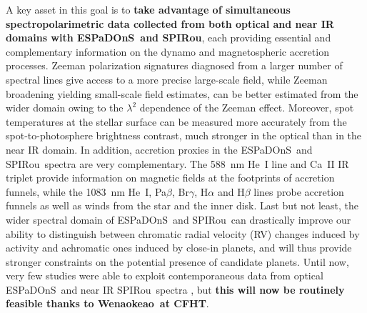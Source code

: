 \documentclass[
    traditabstract,
    longauth,
    onecolumn,
]{aa}
\def \spi{SPIRou}
\def \esp{ESPaDOnS}
\def \wena{Wenaokeao}
\begin{document}
A key asset in this goal is to {\bf take advantage of simultaneous spectropolarimetric data collected from both optical and near IR domains with \esp\ and \spi}, each providing essential and complementary information on the dynamo and magnetospheric accretion processes.  Zeeman polarization signatures diagnosed from a larger number of spectral lines give access to a more precise large-scale field, while Zeeman broadening yielding small-scale field estimates, can be better estimated from the wider domain owing to the $\lambda^2$ dependence of the Zeeman effect.  Moreover, spot temperatures at the stellar surface can be measured more accurately from the spot-to-photosphere brightness contrast, much stronger in the optical than in the near IR domain.  In addition, accretion proxies in the \esp\ and \spi\ spectra are very complementary. The 588~nm He~I line and Ca~II IR triplet provide information on magnetic fields at the footprints of accretion funnels, while the 1083~nm He~I, Pa$\beta$, Br$\gamma$, H$\alpha$ and H$\beta$ lines probe accretion funnels as well as winds from the star and the inner disk.  Last but not least, the wider spectral domain of \esp\ and \spi\ can drastically improve our ability to distinguish between chromatic radial velocity (RV) changes induced by activity and achromatic ones induced by close-in planets, and will thus provide stronger constraints on the potential presence of candidate planets. Until now, very few studies were able to exploit contemporaneous data from optical \esp\ and near IR \spi\ spectra \citep[e.g.,][]{Donati2024b}, but {\bf this will now be routinely feasible thanks to \wena\ at CFHT}.  
\end{document}
